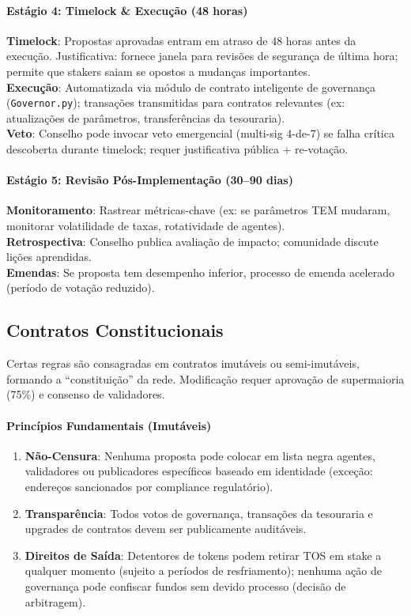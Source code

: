 \documentclass[11pt]{article}
\begin{document}
\begin{itemize}[noitemsep]
\begin{itemize}[noitemsep]
\begin{itemize}[noitemsep]
\paragraph{Estágio 4: Timelock \& Execução (48 horas)}
\textbf{Timelock}: Propostas aprovadas entram em atraso de 48 horas antes da execução. Justificativa: fornece janela para revisões de segurança de última hora; permite que stakers saiam se opostos a mudanças importantes.\\
\textbf{Execução}: Automatizada via módulo de contrato inteligente de governança (\texttt{Governor.py}); transações transmitidas para contratos relevantes (ex: atualizações de parâmetros, transferências da tesouraria).\\
\textbf{Veto}: Conselho pode invocar veto emergencial (multi-sig 4-de-7) se falha crítica descoberta durante timelock; requer justificativa pública + re-votação.

\paragraph{Estágio 5: Revisão Pós-Implementação (30--90 dias)}
\textbf{Monitoramento}: Rastrear métricas-chave (ex: se parâmetros TEM mudaram, monitorar volatilidade de taxas, rotatividade de agentes).\\
\textbf{Retrospectiva}: Conselho publica avaliação de impacto; comunidade discute lições aprendidas.\\
\textbf{Emendas}: Se proposta tem desempenho inferior, processo de emenda acelerado (período de votação reduzido).

\subsection{Contratos Constitucionais}

Certas regras são consagradas em contratos imutáveis ou semi-imutáveis, formando a ``constituição'' da rede. Modificação requer aprovação de supermaioria (75\%) e consenso de validadores.

\paragraph{Princípios Fundamentais (Imutáveis)}
\begin{enumerate}[noitemsep]
  \item \textbf{Não-Censura}: Nenhuma proposta pode colocar em lista negra agentes, validadores ou publicadores específicos baseado em identidade (exceção: endereços sancionados por compliance regulatório).
  \item \textbf{Transparência}: Todos votos de governança, transações da tesouraria e upgrades de contratos devem ser publicamente auditáveis.
  \item \textbf{Direitos de Saída}: Detentores de tokens podem retirar TOS em stake a qualquer momento (sujeito a períodos de resfriamento); nenhuma ação de governança pode confiscar fundos sem devido processo (decisão de arbitragem).
\end{enumerate}


\end{itemize}
\end{itemize}
\end{itemize}
\end{document}
